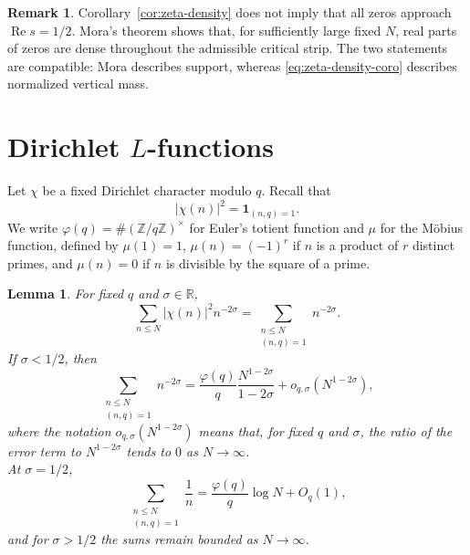 \documentclass[11pt]{article}
\newtheorem{lemma}[theorem]{Lemma}
\theoremstyle{definition}
\newtheorem{remark}[theorem]{Remark}
\newcommand{\R}{\mathbb R}
\newcommand{\Z}{\mathbb Z}
\newcommand{\Ree}{\operatorname{Re}}
\newcommand{\1}{\mathbf 1}
\begin{document}
\begin{remark}\label{rem:zeta-support}
Corollary~\ref{cor:zeta-density} does not imply that all zeros approach $\Ree s=1/2$.  Mora's theorem \cite{Mora2013} shows that, for sufficiently large fixed $N$, real parts of zeros are dense throughout the admissible critical strip.  The two statements are compatible: Mora describes support, whereas \eqref{eq:zeta-density-coro} describes normalized vertical mass.
\end{remark}

\section{Dirichlet \texorpdfstring{$L$}{L}-functions}\label{sec:dirichlet}

Let $\chi$ be a fixed Dirichlet character modulo $q$.  Recall that
\[
|\chi(n)|^2=\mathbf 1_{(n,q)=1}.
\]
We write $\varphi(q)=\#(\Z/q\Z)^\times$ for Euler's totient function and $\mu$ for the Möbius function, defined by $\mu(1)=1$, $\mu(n)=(-1)^r$ if $n$ is a product of $r$ distinct primes, and $\mu(n)=0$ if $n$ is divisible by the square of a prime.

\begin{lemma}\label{lem:dirichlet-energy}
For fixed $q$ and $\sigma\in\R$,
\begin{equation}\label{eq:dirichlet-energy}
\sum_{n\le N}|\chi(n)|^2n^{-2\sigma}
=
\sum_{\substack{n\le N\\(n,q)=1}}n^{-2\sigma}.
\end{equation}
If $\sigma<1/2$, then
\begin{equation}\label{eq:dir-left-asymp}
\sum_{\substack{n\le N\\(n,q)=1}}n^{-2\sigma}
=
\frac{\varphi(q)}{q}\frac{N^{1-2\sigma}}{1-2\sigma}
+o_{q,\sigma}(N^{1-2\sigma}),
\end{equation}
where the notation $o_{q,\sigma}(N^{1-2\sigma})$ means that, for fixed
$q$ and $\sigma$, the ratio of the error term to $N^{1-2\sigma}$
tends to $0$ as $N\to\infty$.\\
At $\sigma=1/2$,
\begin{equation}\label{eq:dir-center-asymp}
\sum_{\substack{n\le N\\(n,q)=1}}\frac1n
=\frac{\varphi(q)}q\log N+O_q(1),
\end{equation}
and for $\sigma>1/2$ the sums remain bounded as $N\to\infty$.
\end{lemma}
\end{document}
